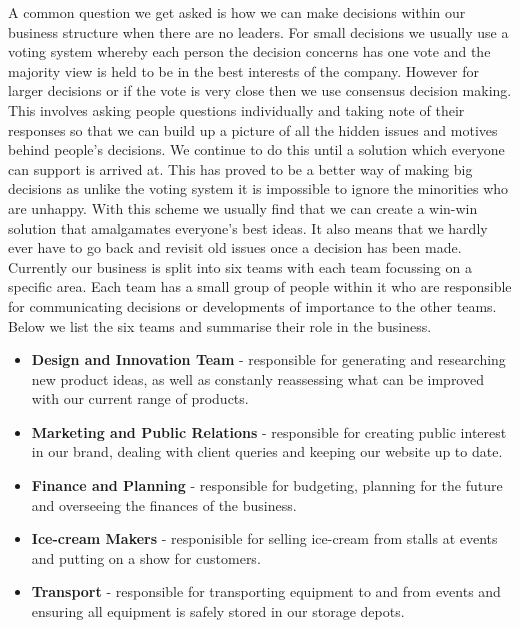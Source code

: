\documentclass{article}
\begin{document}
  A common question we get asked is how we can make decisions within our business structure when there are no leaders. For small decisions we usually use a voting system whereby each person the decision concerns has one vote and the majority view is held to be in the best interests of the company. However for larger decisions or if the vote is very close then we use consensus decision making. This involves asking people questions individually and taking note of their responses so that we can build up a picture of all the hidden issues and motives behind people's decisions. We continue to do this until a solution which everyone can support is arrived at. This has proved to be a better way of making big decisions as unlike the voting system it is impossible to ignore the minorities who are unhappy. With this scheme we usually find that we can create a win-win solution that amalgamates everyone's best ideas. It also means that we hardly ever have to go back and revisit old issues once a decision has been made. \\

  Currently our business is split into six teams with each team focussing on a specific area. Each team has a small group of people within it who are responsible for communicating decisions or developments of importance to the other teams. Below we list the six teams and summarise their role in the business.
  \begin{itemize}

  \item {\bf Design and Innovation Team} - responsible for generating and researching new product ideas, as well as constanly reassessing what can be improved with our current range of products.

  \item {\bf Marketing and Public Relations} - responsible for creating public interest in our brand, dealing with client queries and keeping our website up to date.

  \item {\bf Finance and Planning} - responsible for budgeting, planning for the future and overseeing the finances of the business.

  \item {\bf Ice-cream Makers} - responisible for selling ice-cream from stalls at events and putting on a show for customers.

  \item {\bf Transport} - responsible for transporting equipment to and from events and ensuring all equipment is safely stored in our storage depots.
  
  \end{itemize}
\end{document}
